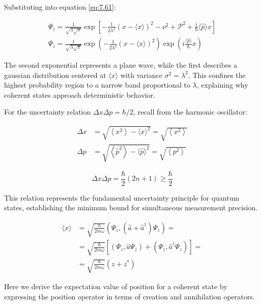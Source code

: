 Substituting into equation \eqref{eq:7.61}:

\begin{gather}
\Psi_{z}=\frac{1}{\sqrt{\lambda \sqrt{\pi}}} \exp \left[-\frac{1}{2 \lambda^{2}}(x-\langle x\rangle)^{2}-\mathcal{\nu}^{2}+\mathcal{P}^{2}+\frac{i}{\hbar}\langle\hat{p}\rangle x\right]  \\
\Psi_{z}=\frac{1}{\sqrt{\lambda \sqrt{\pi}}} \exp \left(-\frac{1}{2 \lambda^{2}}(x-\langle x\rangle)^{2}\right) \exp \left(i \frac{\langle\hat{p}\rangle}{\hbar} x\right)
\end{gather}

The second exponential represents a plane wave, while the first describes a gaussian distribution centered at $\langle x\rangle$ with variance $\sigma^{2}=\lambda^{2}$. This confines the highest probability region to a narrow band proportional to $\lambda$, explaining why coherent states approach deterministic behavior.

For the uncertainty relation $\Delta x \Delta p=\hbar / 2$, recall from the harmonic oscillator:

\begin{align}
\Delta x & =\sqrt{\left\langle x^{2}\right\rangle-\langle x\rangle^{2}}=\sqrt{\left\langle x^{2}\right\rangle} \\
\Delta p & =\sqrt{\left\langle\hat{p}^{2}\right\rangle-\langle\hat{p}\rangle^{2}}=\sqrt{\left\langle p^{2}\right\rangle}
\end{align}

\begin{equation}
\Delta x \Delta p=\frac{\hbar}{2}(2 n+1) \geq \frac{\hbar}{2}
\end{equation}

This relation represents the fundamental uncertainty principle for quantum states, establishing the minimum bound for simultaneous measurement precision.

\begin{align}
\langle x\rangle & =\sqrt{\frac{\hbar}{2 m \omega}}\left(\Psi_{z},\left(\hat{a}+\hat{a}^{\dagger}\right) \Psi_{z}\right)= \\
& =\sqrt{\frac{\hbar}{2 m \omega}}\left[\left(\Psi_{z}, \hat{a} \Psi_{z}\right)+\left(\Psi_{z}, \hat{a}^{\dagger} \Psi_{z}\right)\right]=  \\
& =\sqrt{\frac{\hbar}{2 m \omega}}\left(z+z^{*}\right)
\end{align}

Here we derive the expectation value of position for a coherent state by expressing the position operator in terms of creation and annihilation operators.

